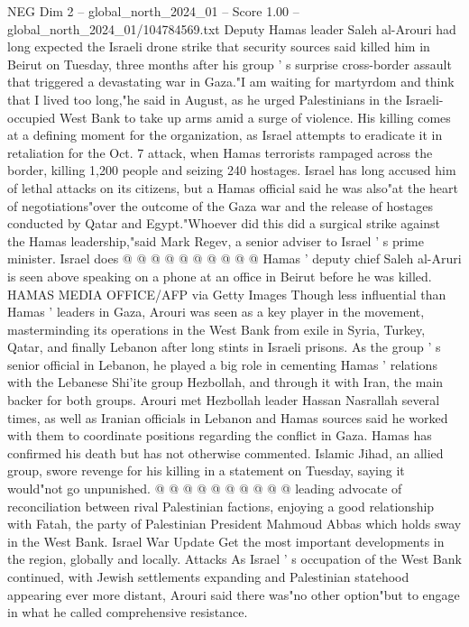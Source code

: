 \begin{textsample}{NEG Dim 2 – global\_north\_2024\_01 – Score 1.00 – global\_north\_2024\_01/104784569.txt}  \label{ex:f2_neg_248}
Deputy Hamas leader Saleh al-Arouri had long expected the Israeli drone strike that security sources said killed him in Beirut on Tuesday, three months after his group ' s surprise cross-border assault that triggered a devastating war in Gaza."I am waiting for martyrdom and think that I lived too long,"he said in August, as he urged Palestinians in the Israeli-occupied West Bank to take up arms amid a surge of violence.
His killing comes at a defining moment for the organization, as Israel attempts to eradicate it in retaliation for the Oct. 7 attack, when Hamas terrorists rampaged across the border, killing 1,200 people and seizing 240 hostages.
Israel has long accused him of lethal attacks on its citizens, but a Hamas official said he was also"at the heart of negotiations"over the outcome of the Gaza war and the release of hostages conducted by Qatar and Egypt."Whoever did this did a surgical strike against the Hamas leadership,"said Mark Regev, a senior adviser to Israel ' s prime minister.
Israel does @ @ @ @ @ @ @ @ @ @ Hamas ' deputy chief Saleh al-Aruri is seen above speaking on a phone at an office in Beirut before he was killed.
HAMAS MEDIA OFFICE/AFP via Getty Images Though less influential than Hamas ' leaders in Gaza, Arouri was seen as a key player in the movement, masterminding its operations in the West Bank from exile in Syria, Turkey, Qatar, and finally Lebanon after long stints in Israeli prisons.
As the group ' s senior official in Lebanon, he played a big role in cementing Hamas ' relations with the Lebanese Shi'ite group Hezbollah, and through it with Iran, the main backer for both groups.
Arouri met Hezbollah leader Hassan Nasrallah several times, as well as Iranian officials in Lebanon and Hamas sources said he worked with them to coordinate positions regarding the conflict in Gaza.
Hamas has confirmed his death but has not otherwise commented.
Islamic Jihad, an allied group, swore revenge for his killing in a statement on Tuesday, saying it would"not go unpunished. @ @ @ @ @ @ @ @ @ @ leading advocate of reconciliation between rival Palestinian factions, enjoying a good relationship with Fatah, the party of Palestinian President Mahmoud Abbas which holds sway in the West Bank.
Israel War Update Get the most important developments in the region, globally and locally.
Attacks As Israel ' s occupation of the West Bank continued, with Jewish settlements expanding and Palestinian statehood appearing ever more distant, Arouri said there was"no other option"but to engage in what he called comprehensive resistance.

\end{textsample}
